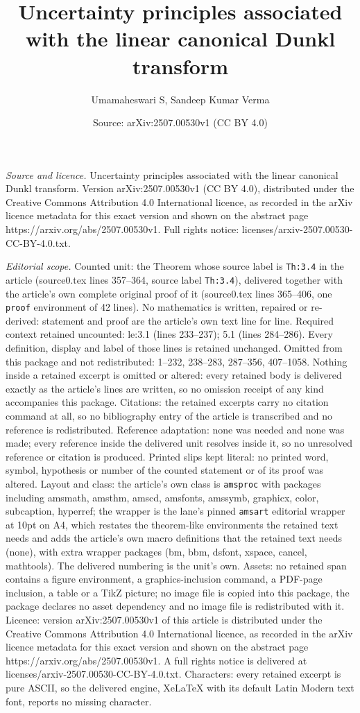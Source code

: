 \documentclass[10pt,a4paper]{amsart}
\title[Uncertainty principles associated with the linear canonical ]{Uncertainty principles associated with the linear canonical Dunkl transform}
\author{Umamaheswari S, Sandeep Kumar Verma}
\date{Source: arXiv:2507.00530v1 (CC BY 4.0)}
\begin{document}
\maketitle

\noindent\emph{Source and licence.} Uncertainty principles associated with the linear canonical Dunkl transform. Version arXiv:2507.00530v1 (CC BY 4.0), distributed under the Creative Commons Attribution 4.0 International licence, as recorded in the arXiv licence metadata for this exact version and shown on the abstract page https://arxiv.org/abs/2507.00530v1. Full rights notice: licenses/arxiv-2507.00530-CC-BY-4.0.txt.\par\smallskip

\noindent\textit{Editorial scope.} Counted unit: the Theorem whose source label is \texttt{Th:3.4} in the article (source0.tex lines 357--364, source label \texttt{Th:3.4}), delivered together with the article's own complete original proof of it (source0.tex lines 365--406, one \texttt{proof} environment of 42 lines). No mathematics is written, repaired or re-derived: statement and proof are the article's own text line for line. Required context retained uncounted: le:3.1 (lines 233--237); 5.1 (lines 284--286). Every definition, display and label of those lines is retained unchanged. Omitted from this package and not redistributed: 1--232, 238--283, 287--356, 407--1058. Nothing inside a retained excerpt is omitted or altered: every retained body is delivered exactly as the article's lines are written, so no omission receipt of any kind accompanies this package. Citations: the retained excerpts carry no citation command at all, so no bibliography entry of the article is transcribed and no reference is redistributed. Reference adaptation: none was needed and none was made; every reference inside the delivered unit resolves inside it, so no unresolved reference or citation is produced. Printed slips kept literal: no printed word, symbol, hypothesis or number of the counted statement or of its proof was altered. Layout and class: the article's own class is \texttt{amsproc} with packages including amsmath, amsthm, amscd, amsfonts, amssymb, graphicx, color, subcaption, hyperref; the wrapper is the lane's pinned \texttt{amsart} editorial wrapper at 10pt on A4, which restates the theorem-like environments the retained text needs and adds the article's own macro definitions that the retained text needs (none), with extra wrapper packages (bm, bbm, dsfont, xspace, cancel, mathtools). The delivered numbering is the unit's own. Assets: no retained span contains a figure environment, a graphics-inclusion command, a PDF-page inclusion, a table or a TikZ picture; no image file is copied into this package, the package declares no asset dependency and no image file is redistributed with it. Licence: version arXiv:2507.00530v1 of this article is distributed under the Creative Commons Attribution 4.0 International licence, as recorded in the arXiv licence metadata for this exact version and shown on the abstract page https://arxiv.org/abs/2507.00530v1. A full rights notice is delivered at licenses/arxiv-2507.00530-CC-BY-4.0.txt. Characters: every retained excerpt is pure ASCII, so the delivered engine, XeLaTeX with its default Latin Modern text font, reports no missing character.
\end{document}
